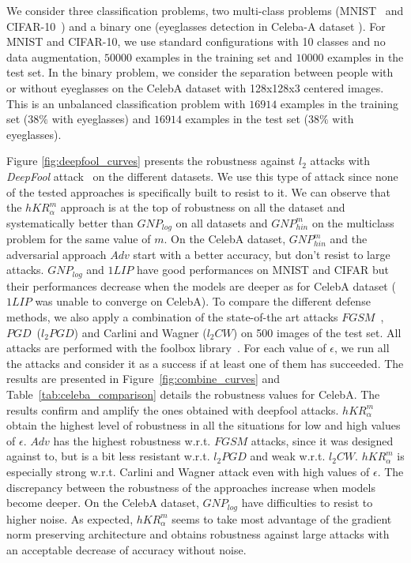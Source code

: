 We consider three classification problems, two multi-class problems (MNIST~\cite{lecun-mnisthandwrittendigit-2010} and CIFAR-10~\cite{Krizhevsky09learningmultiple}) and a binary one (eyeglasses detection in Celeba-A dataset \cite{liu2015faceattributes}). For MNIST and CIFAR-10, we use standard configurations with 10 classes and no data augmentation, $50 000$ examples in the training set and $10 000$ examples in the test set. In the binary problem, we consider the separation between people with or without eyeglasses on the CelebA dataset with 128x128x3 centered images. This is an unbalanced classification problem with $16914$ examples in the training set ($38\%$ with eyeglasses) and $16914$ examples in the test set ($38\%$ with eyeglasses).

Figure \ref{fig:deepfool_curves} presents the robustness against $l_2$ attacks with \textit{DeepFool} attack~\cite{moosavi-deepfool15} on the different datasets. We use this type of attack since none of the tested approaches is specifically built to resist to it. We can observe that the $hKR^m_\alpha$ approach is at the top of robustness on all the dataset and systematically better than $GNP_{log}$ on all datasets and $GNP^m_{hin}$ on the multiclass problem for the same value of $m$. On the CelebA dataset, $GNP^m_{hin}$ and the adversarial approach $Adv$ start with a better accuracy, but don't resist to large attacks. $GNP_{log}$ and $1LIP$ have good performances on MNIST and CIFAR but their performances decrease when the models are deeper as for CelebA dataset ($1LIP$ was unable to converge on CelebA). To compare the different defense methods, we also apply a combination of the state-of-the art attacks $FGSM$~\cite{Goodfellow2014a}, $PGD$~($l_2PGD$) \cite{Madry2017} and  Carlini and Wagner ($l_2CW$) \cite{carlini2017towards} on 500 images of the test set. All attacks are performed with the  foolbox library~\cite{rauber2017foolbox}. For each value of $\epsilon$, we run all the attacks and consider it as a success if at least one of them has succeeded. The results are presented in Figure~\ref{fig:combine_curves} and Table~\ref{tab:celeba_comparison} details the robustness values for CelebA. The results confirm and amplify the ones obtained with deepfool attacks. $hKR^m_\alpha$ obtain the highest level of robustness in all the situations for low and high values of $\epsilon$. 
$Adv$ has the highest robustness w.r.t. $FGSM$ attacks, since it was designed against to, but is a bit less resistant w.r.t. $l_2PGD$ and weak w.r.t. $l_2CW$. $hKR^m_\alpha$ is especially strong w.r.t. Carlini and Wagner attack even with high values of $\epsilon$. The discrepancy between the robustness of the approaches increase when models become deeper. On the CelebA dataset,  $GNP_{log}$ have difficulties to resist to higher noise. As expected, $hKR^m_\alpha$ seems to take most advantage of the gradient norm preserving architecture and obtains robustness against large attacks with an acceptable decrease of accuracy without noise. 

